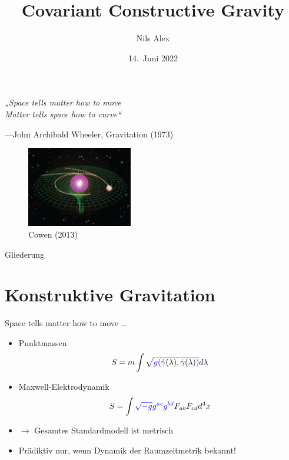 \documentclass{beamer}
\title{Covariant Constructive Gravity}
\date{14.\ Juni 2022}
\author{Nils Alex}
\institute{FAU Erlangen-Nürnberg}
\begin{document}
    \maketitle

    \begin{frame}{}
        \vspace{12ex}
        \Large
        \textit{„Space tells matter how to move \\
        Matter tells space how to curve“}

        \normalsize
        ---John Archibald Wheeler, Gravitation (1973)

        \begin{figure}
            \hspace{14ex}
            \includegraphics[height=3.5cm]{curvature}
            \vspace{-1ex}
            \caption*{\scriptsize \lbrack Cowen (2013)\rbrack}
            \label{fig:figure}
        \end{figure}
    \end{frame}

    \begin{frame}{Gliederung}
        \tableofcontents[pausesections]
    \end{frame}


    \section{Konstruktive Gravitation}\label{sec:constructive-gravity}

    \begin{frame}{Space tells matter how to move \ldots}
        \begin{itemize}
            \item Punktmassen
            \[ S = m \int \sqrt{{\color{blue}g(}\dot\gamma(\lambda),\dot\gamma(\lambda){\color{blue})}} d\lambda \]
            \item Maxwell-Elektrodynamik
            \[ S = \int {\color{blue}\sqrt{-g}g^{ac}g^{bd}} F_{ab} F_{cd} d^4 x \]
            \item $\rightarrow$ Gesamtes Standardmodell ist metrisch
            \item Prädiktiv nur, wenn Dynamik der Raumzeitmetrik bekannt!
        \end{itemize}
    \end{frame}
\end{document}
